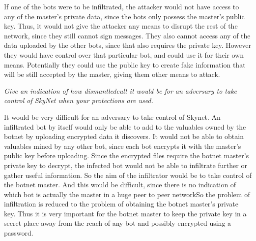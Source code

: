 \documentclass[9pt,a4paper]{article}
\begin{document}
If one of the bots were to be infiltrated, the attacker would not have access to any of the master's private data, since the bots only possess the master's public key. Thus, it would not give the attacker any means to disrupt the rest of the network, since they still cannot sign messages. They also cannot access any of the data uploaded by the other bots, since that also requires the private key. However they would have control over that particular bot, and could use it for their own means. Potentially they could use the public key to create fake information that will be still accepted by the master, giving them other means to attack. 



\emph{Give an indication of how dismantledcult it would be for an adversary to take control of SkyNet when your protections are used.}

It would be very difficult for an adversary to take control of Skynet.
An infiltrated bot by itself would only be able to add to the valuables owned by the botnet by uploading encrypted data it discovers. It would not be able to obtain valuables mined by any other bot, since each bot encrypts it with the master's public key before uploading. Since the encrypted files require the botnet master's private key to decrypt, the infected bot would not be able to infiltrate further or gather useful information.
So the aim of the infiltrator would be to  take control of the botnet master. And this would be difficult, since there is no indication of which bot is actually the master in a huge peer to peer networkSo the problem of infiltration is reduced to the problem of obtaining the botnet master's private key. Thus it is very important for the botnet master to keep the private key in a secret place away from the reach of any bot and possibly encrypted using a password.
\end{document}
